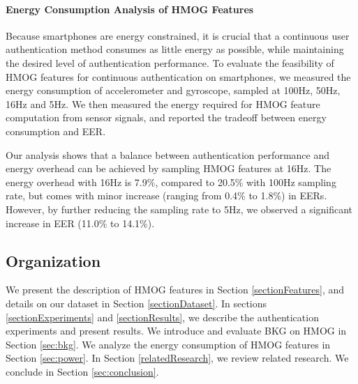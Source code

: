 \paragraph{Energy Consumption Analysis of HMOG Features}
Because smartphones are energy constrained, it is crucial that a continuous user authentication method consumes as little energy as possible, while maintaining the desired level of authentication performance. To evaluate the feasibility of HMOG features for continuous authentication on smartphones, we measured the energy consumption of accelerometer and gyroscope, sampled at 100Hz, 50Hz, 16Hz and 5Hz. We then measured the energy required for HMOG feature computation from sensor signals, and reported the tradeoff between energy consumption and EER. 


Our analysis shows that a balance between authentication performance and energy overhead can be achieved by sampling HMOG features at 16Hz. The energy overhead with 16Hz is 7.9\%, compared to 20.5\% with 100Hz sampling rate, but comes with minor increase (ranging from 0.4\% to 1.8\%) in EERs. However, by further reducing the sampling rate to 5Hz, we observed a significant increase in EER (11.0\% to 14.1\%). %
%
%
%
%
%
%
%
%
%
%
%
%
%
%
%
%
%
%



\subsection{Organization}
We present the description of HMOG features in Section \ref{sectionFeatures}, and details on our dataset in Section \ref{sectionDataset}. In sections \ref{sectionExperiments} and \ref{sectionResults}, we describe the authentication experiments and present results. We introduce and evaluate BKG on HMOG in Section \ref{sec:bkg}. We analyze the energy consumption of HMOG features in Section \ref{sec:power}. In Section \ref{relatedResearch}, we review related research.  We conclude in Section \ref{sec:conclusion}.


